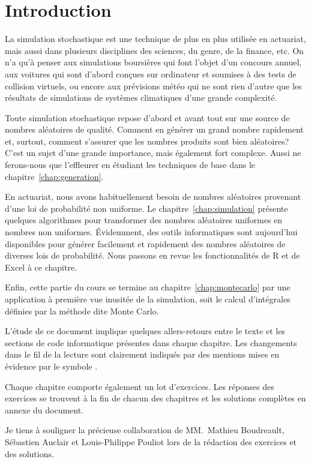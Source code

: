 \chapter*{Introduction}

La simulation stochastique est une technique de plus en plus utilisée
en actuariat, mais aussi dans plusieurs disciplines des sciences, du
genre, de la finance, etc. On n’a qu’à penser aux simulations
boursières qui font l’objet d’un concours annuel, aux voitures qui
sont d’abord conçues sur ordinateur et soumises à des tests de
collision virtuels, ou encore aux prévisions météo qui ne sont rien
d'autre que les résultats de simulations de systèmes climatiques
d'une grande complexité.

Toute simulation stochastique repose d’abord et avant tout sur une
source de nombres aléatoires de qualité. Comment en générer un grand
nombre rapidement et, surtout, comment s’assurer que les nombres
produits sont bien aléatoires? C’est un sujet d’une grande importance,
mais également fort complexe. Aussi ne ferons-nous que l'effleurer en
étudiant les techniques de base dans le
chapitre~\ref{chap:generation}.

En actuariat, nous avons habituellement besoin de nombres aléatoires
provenant d’une loi de probabilité non uniforme. Le
chapitre~\ref{chap:simulation} présente quelques algorithmes pour
transformer des nombres aléatoires uniformes en nombres non uniformes.
Évidemment, des outils informatiques sont aujourd'hui disponibles pour
générer facilement et rapidement des nombres aléatoires de diverses
lois de probabilité. Nous passons en revue les fonctionnalités de R et
de Excel à ce chapitre.

Enfin, cette partie du cours se termine au
chapitre~\ref{chap:montecarlo} par une application à première vue
inusitée de la simulation, soit le calcul d’intégrales définies par la
méthode dite Monte Carlo.

L'étude de ce document implique quelques allers-retours entre le texte
et les sections de code informatique présentes dans chaque chapitre.
Les changements dans le fil de la lecture sont clairement indiqués par
des mentions mises en évidence par le symbole {\color{darkred}\noway}.

Chaque chapitre comporte également un lot d'exercices. Les réponses
des exercices se trouvent à la fin de chacun des chapitres et les
solutions complètes en annexe du document.

Je tiens à souligner la précieuse collaboration de MM.~Mathieu
Boudreault, Sébastien Auclair et Louis-Philippe Pouliot lors de la
rédaction des exercices et des solutions.

